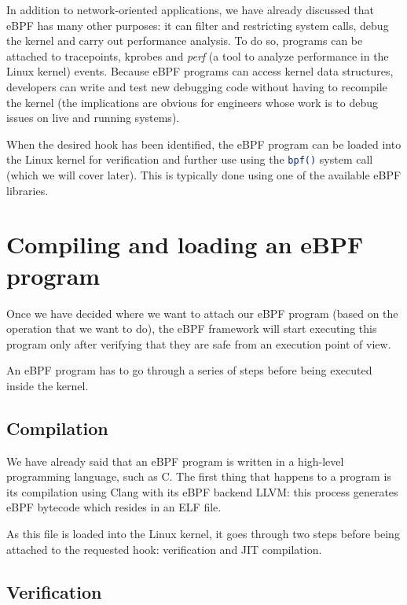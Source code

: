 In addition to network-oriented applications, we have already discussed that eBPF has many other purposes: it can filter and restricting system calls, debug the kernel and carry out performance analysis.
To do so, programs can be attached to tracepoints, kprobes and \textit{perf} (a tool to analyze performance in the Linux kernel) events.
Because eBPF programs can access kernel data structures, developers can write and test new debugging code without having to recompile the kernel (the implications are obvious for engineers whose work is to debug issues on live and running systems).

When the desired hook has been identified, the eBPF program can be loaded into the Linux kernel for verification and further use using the \colorbox{backcolour}{\lstinline[style=commandline, language=bash, breaklines=true]|bpf()|} system call (which we will cover later). 
This is typically done using one of the available eBPF libraries. 

\section{Compiling and loading an eBPF program}

Once we have decided where we want to attach our eBPF program (based on the operation that we want to do), the eBPF framework will start executing this program only after verifying that they are safe from an execution point of view. 

An eBPF program has to go through a series of steps before being executed inside the kernel.

\subsection{Compilation}

We have already said that an eBPF program is written in a high-level programming language, such as C.
The first thing that happens to a program is its compilation using Clang with its eBPF backend LLVM: this process generates eBPF bytecode which resides in an ELF file.

As this file is loaded into the Linux kernel, it goes through two steps before being attached to the requested hook: verification and JIT compilation.

\subsection{Verification}


